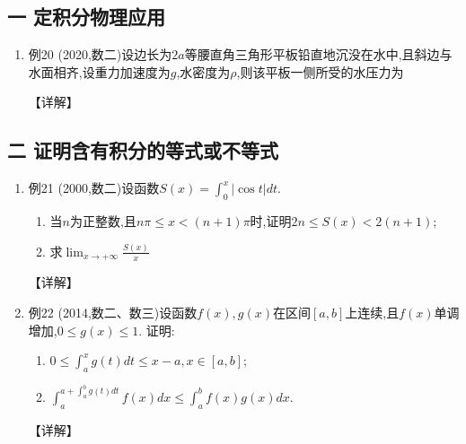 \documentclass[12pt, a4paper, oneside, UTF8]{ctexbook}
\begin{document}
\subsection{一 定积分物理应用}

\begin{enumerate}[label=\arabic*.,start=19]
    \item 例20 (2020,数二)设边长为$2a$等腰直角三角形平板铅直地沉没在水中,且斜边与水面相齐,设重力加速度为$g$,水密度为$\rho$,则该平板一侧所受的水压力为
    
    \begin{solution}
    【详解】
    \end{solution}
\end{enumerate}

\subsection{二 证明含有积分的等式或不等式}

\begin{enumerate}[label=\arabic*.,start=20]
    \item 例21 (2000,数二)设函数$S(x)=\int_0^x|\cos t| dt$.
    \begin{enumerate}[label=(\roman*)]
        \item 当$n$为正整数,且$n\pi\leq x<(n+1)\pi$时,证明$2n\leq S(x)<2(n+1)$;
        \item 求$\lim_{x\to+\infty}\frac{S(x)}{x}$
    \end{enumerate}
    
    \begin{solution}
    【详解】
    \end{solution}
    
    \item 例22 (2014,数二、数三)设函数$f(x), g(x)$在区间$[a, b]$上连续,且$f(x)$单调增加,$0\leq g(x)\leq 1$.
    证明:
    \begin{enumerate}[label=(\roman*)]
        \item $0\leq\int_a^x g(t) dt\leq x-a, x\in[a, b]$;
        \item $\int_a^{a+\int_a^b g(t) dt} f(x) dx\leq\int_a^b f(x) g(x) dx$.
    \end{enumerate}
    
    \begin{solution}
    【详解】
    \end{solution}
\end{enumerate}
\end{document}
